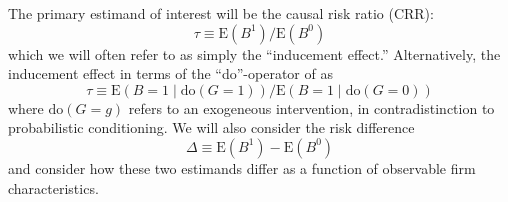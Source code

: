 \documentclass[aoas,preprint, 11pt, dvipsnames, table, x11name]{imsart}
\newcommand{\E}{\mbox{E}}
\theoremstyle{remark}
\begin{document}
	The primary estimand of interest will be the causal risk ratio (CRR):
	\begin{equation}
		\tau \equiv \E(B^1)/\E(B^0)
	\end{equation}
	which we will often refer to as simply the ``inducement effect.'' Alternatively, the inducement effect in terms of the ``do''-operator of \cite{pearl-2000} as 
	\begin{equation}
		\tau \equiv \E(B=1 \mid \text{do}(G=1))/\E(B=1 \mid \text{do}(G=0))
	\end{equation}
	where $\text{do}(G=g)$ refers to an exogeneous intervention, in contradistinction to probabilistic conditioning. We will also consider the risk difference
	\begin{equation}
		\Delta \equiv \E(B^1) - \E(B^0)
	\end{equation}
	and consider how these two estimands differ as a function of observable firm characteristics.
	
\end{document}
